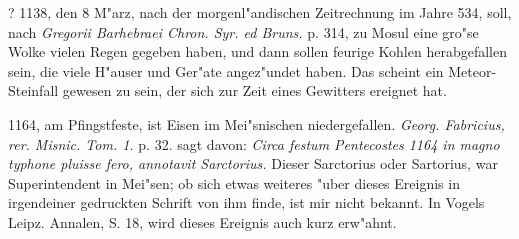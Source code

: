 \documentclass[a4paper, 11pt, oneside, polutonikogreek, german]{article}
\begin{document}
? 1138, den 8 M"arz, nach der morgenl"andischen Zeitrechnung im Jahre 534, soll, nach \emph{Gregorii Barhebraei Chron. Syr. ed Bruns.} p. 314, zu Mosul eine gro"se Wolke vielen Regen gegeben haben, und dann sollen feurige Kohlen herabgefallen sein, die viele H"auser und Ger"ate angez"undet haben. Das scheint ein Meteor-Steinfall gewesen zu sein, der sich zur Zeit eines Gewitters ereignet hat.

1164, am Pfingstfeste, ist Eisen im Mei"snischen niedergefallen. \emph{Georg. Fabricius, rer. Misnic. Tom. 1.} p. 32. sagt davon: \emph{Circa festum Pentecostes 1164 in magno typhone pluisse fero, annotavit Sarctorius.} Dieser Sarctorius oder Sartorius, war Superintendent in Mei"sen; ob sich etwas weiteres "uber dieses Ereignis in irgendeiner gedruckten Schrift von ihm finde, ist mir nicht bekannt. In Vogels Leipz. Annalen, S. 18, wird dieses Ereignis auch kurz erw"ahnt.
\end{document}
